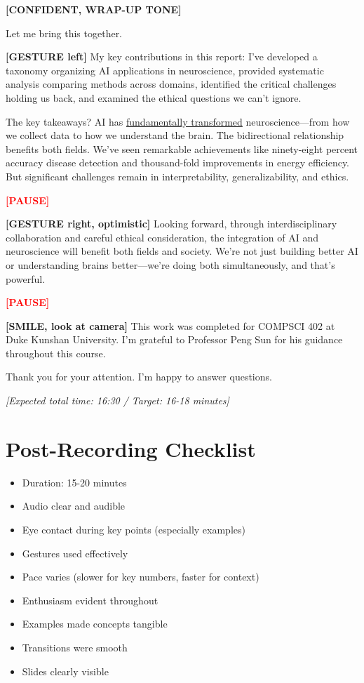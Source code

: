 \documentclass[12pt]{article}
\begin{document}
\textcolor{DukeBlue}{\textbf{[CONFIDENT, WRAP-UP TONE]}}

Let me bring this together.

\textcolor{DukeBlue}{\textbf{[GESTURE left]}} My key contributions in this report: I've developed a taxonomy organizing AI applications in neuroscience, provided systematic analysis comparing methods across domains, identified the critical challenges holding us back, and examined the ethical questions we can't ignore.

The key takeaways? AI has \ul{fundamentally transformed} neuroscience—from how we collect data to how we understand the brain. The bidirectional relationship benefits both fields. We've seen remarkable achievements like ninety-eight percent accuracy disease detection and thousand-fold improvements in energy efficiency. But significant challenges remain in interpretability, generalizability, and ethics.

\textcolor{red}{\textbf{[PAUSE]}}

\textcolor{DukeBlue}{\textbf{[GESTURE right, optimistic]}} Looking forward, through interdisciplinary collaboration and careful ethical consideration, the integration of AI and neuroscience will benefit both fields and society. We're not just building better AI or understanding brains better—we're doing both simultaneously, and that's powerful.

\textcolor{red}{\textbf{[PAUSE]}}

\textcolor{DukeBlue}{\textbf{[SMILE, look at camera]}} This work was completed for COMPSCI 402 at Duke Kunshan University. I'm grateful to Professor Peng Sun for his guidance throughout this course.

\vspace{1em}

{\Large Thank you for your attention. I'm happy to answer questions.}

\textit{[Expected total time: 16:30 / Target: 16-18 minutes]}

\vspace{2em}

\hrulefill

\section*{Post-Recording Checklist}

\begin{itemize}
  \item[$\square$] Duration: 15-20 minutes
  \item[$\square$] Audio clear and audible
  \item[$\square$] Eye contact during key points (especially examples)
  \item[$\square$] Gestures used effectively
  \item[$\square$] Pace varies (slower for key numbers, faster for context)
  \item[$\square$] Enthusiasm evident throughout
  \item[$\square$] Examples made concepts tangible
  \item[$\square$] Transitions were smooth
  \item[$\square$] Slides clearly visible
\end{itemize}
\end{document}
